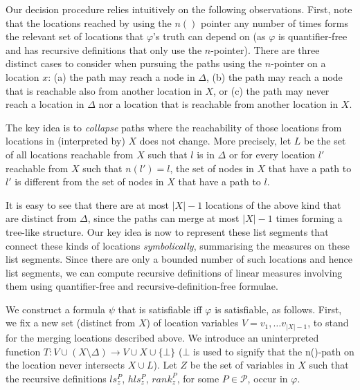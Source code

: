 Our decision procedure relies intuitively on the following observations. First, note that the locations
reached by using the $n()$ pointer any number of times forms the relevant set of locations that $\varphi$'s
truth can depend on (as $\varphi$ is quantifier-free and has recursive definitions that only use the $n$-pointer).
There are three distinct cases to consider when pursuing the paths using the $n$-pointer on a location $x$:
(a) the path may reach a node in $\Delta$, (b) the path may reach a node that is reachable also from another location in $X$,
or (c) the path may never reach a location in $\Delta$ nor a location that is reachable from another location in $X$. 

The key idea is to \emph{collapse} paths where the reachability of those locations from locations in (interpreted by) $X$ does not change.
More precisely, let $L$ be the set of all locations reachable from $X$ such that $l$ is in $\Delta$ or 
for every location $l'$ reachable from $X$ such that $n(l')=l$, the set of nodes in $X$ that have a path
to $l'$ is different from the set of nodes in $X$ that have a path to $l$.

It is easy to see that there are at most $|X|-1$ locations of the above kind that are distinct from $\Delta$,
since the paths can merge at most $|X|-1$ times forming a tree-like structure. Our key idea is now to 
represent these list segments that connect these kinds of locations \emph{symbolically}, summarising the 
measures on these list segments. Since there are only a bounded number of such locations and hence list
segments, we can compute recursive definitions of linear measures involving them using quantifier-free
and recursive-definition-free formulae.

We construct a formula $\psi$ that is satisfiable iff $\varphi$ is satisfiable, as follows.
First, we fix a new set (distinct from $X$) of location variables $V={v_1, \ldots v_{|X|-1}}$,
to stand for the merging locations described above.
We introduce an uninterpreted function $T: V \cup (X\setminus \Delta) \longrightarrow V \cup X \cup \{\bot\}$
($\bot$ is used to signify that the n()-path on the location never intersects $X \cup{} L$).
Let $Z$ be the set of variables in $X$ such that the recursive definitions $ls_z^P$, $hls_z^P$, $rank_z^P$, for some
$P \in \mathcal{P}$, occur in $\varphi$.

